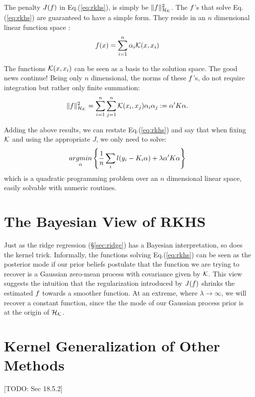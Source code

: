 The penalty $J(f)$ in Eq.(\ref{eq:rkhs}), is simply be $\Vert f \Vert_{\mathcal{H}_{\mathcal{K}}}^2$.
The $f$'s that solve Eq.(\ref{eq:rkhs}) are guaranteed to have a simple form. They reside in an $n$ dimensional linear function space \citep{wahba_spline_1990}:
\begin{align}
	f(x)=\sum_{i=1}^n \alpha_i \mathcal{K}(x,x_i)
\end{align}

The functions $\mathcal{K}(x,x_i)$ can be seen as a basis to the solution space. 
The good news continue! Being only $n$ dimensional, the norms of these $f$'s, do not require integration but rather only finite summation:
\begin{align}
	\Vert f \Vert_{\mathcal{H}_{\mathcal{K}}}^2=\sum_{i=1}^n \sum_{j=1}^n \mathcal{K}(x_i,x_j) \alpha_i \alpha_{j} := \alpha' K \alpha.
\end{align}

Adding the above results, we can restate Eq.(\ref{eq:rkhs}) and say that when fixing $\mathcal{K}$ and using the appropriate $J$, we only need to solve: 
\begin{align}	
\label{eq:rkhs_simple}
		\mathop{argmin} _{\alpha}\left\{ \frac{1}{n} \sum_i l(y_i-K_i \alpha) + \lambda \alpha' K \alpha  \right\}
\end{align}
which is a quadratic programming problem over an $n$ dimensional linear space, easily solvable with numeric routines.


\section{The Bayesian View of RKHS}
Just as the ridge regression (\S\ref{sec:ridge}) has a Bayesian interpretation, so does the kernel trick.
Informally, the functions solving Eq.(\ref{eq:rkhs}) can be seen as the posterior mode if our prior beliefs postulate that the function we are trying to recover is a Gaussian zero-mean process with covariance given by $\mathcal{K}$.
This view suggests the intuition that the regularization introduced by $J(f)$ shrinks the estimated $f$ towards a smoother function. At an extreme, where $\lambda\to\infty$, we will recover a constant function, since the the mode of our Gaussian process prior is at the origin of $\mathcal{H}_{\mathcal{K}}$.


\section{Kernel Generalization of Other Methods}
[TODO: Sec 18.5.2]






